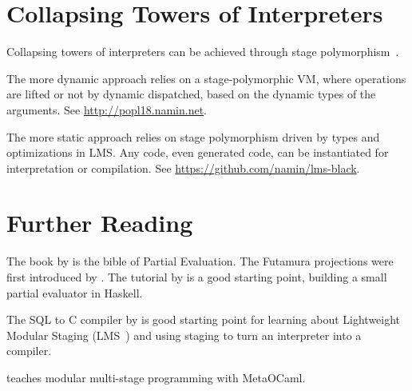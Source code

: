 \section{Collapsing Towers of Interpreters}

Collapsing towers of interpreters can be achieved through stage
polymorphism~\citep{collapsing-towers}.

The more dynamic approach relies on a stage-polymorphic VM, where
operations are lifted or not by dynamic dispatched,
based on the dynamic types of the arguments.
See \url{http://popl18.namin.net}.

The more static approach relies on stage polymorphism driven by types
and optimizations in LMS. Any code, even generated code, can be
instantiated for interpretation or compilation. See
\url{https://github.com/namin/lms-black}.

\section{Further Reading}

The book by \cite{pebook} is the bible of Partial Evaluation. The
Futamura projections were first introduced by
\cite{Futamura:1971,Futamura:1999}. The tutorial by \cite{cook2011tutorial} is a
good starting point, building a small partial evaluator in Haskell.

The SQL to C compiler by \cite{query-pearl} is good starting point for
learning about Lightweight Modular Staging (LMS~\citep{lms}) and using staging to
turn an interpreter into a compiler.

\cite{oleg-tutorial} teaches modular multi-stage programming with
MetaOCaml.
